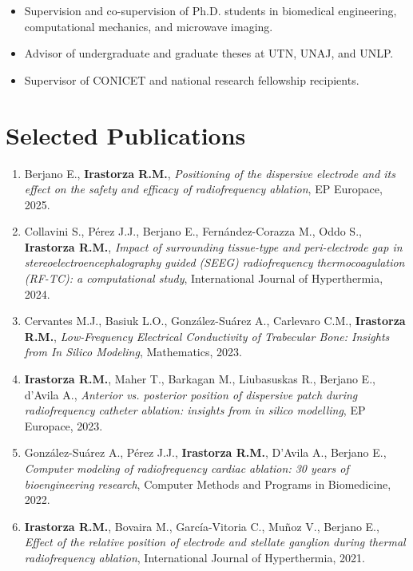 \documentclass[11pt]{article}
\begin{document}
\begin{itemize}[leftmargin=*]
    \item Supervision and co-supervision of Ph.D. students in biomedical engineering, computational mechanics, and microwave imaging.
    \item Advisor of undergraduate and graduate theses at UTN, UNAJ, and UNLP.
    \item Supervisor of CONICET and national research fellowship recipients.
\end{itemize}

\section*{Selected Publications}

\begin{enumerate}[leftmargin=*]

\item Berjano E., \textbf{Irastorza R.M.},
\textit{Positioning of the dispersive electrode and its effect on the safety and efficacy of radiofrequency ablation},
EP Europace, 2025.

\item Collavini S., Pérez J.J., Berjano E., Fernández-Corazza M., Oddo S., {\bf Irastorza R.M.},
\textit{Impact of surrounding tissue-type and peri-electrode gap in stereoelectroencephalography guided (SEEG) radiofrequency thermocoagulation (RF-TC): a computational study},
International Journal of Hyperthermia, 2024.

\item Cervantes M.J., Basiuk L.O., González-Suárez A., Carlevaro C.M., \textbf{Irastorza R.M.},
\textit{Low-Frequency Electrical Conductivity of Trabecular Bone: Insights from In Silico Modeling},
Mathematics, 2023.

\item \textbf{Irastorza R.M.}, Maher T., Barkagan M., Liubasuskas R., Berjano E., d’Avila A.,
\textit{Anterior vs. posterior position of dispersive patch during radiofrequency catheter ablation: insights from in silico modelling},
EP Europace, 2023.

\item González-Suárez A., Pérez J.J., \textbf{Irastorza R.M.}, D'Avila A., Berjano E.,
\textit{Computer modeling of radiofrequency cardiac ablation: 30 years of bioengineering research},
Computer Methods and Programs in Biomedicine, 2022.

\item \textbf{Irastorza R.M.}, Bovaira M., García-Vitoria C., Muñoz V., Berjano E.,
\textit{Effect of the relative position of electrode and stellate ganglion during thermal radiofrequency ablation},
International Journal of Hyperthermia, 2021.


\end{enumerate}
\end{document}
